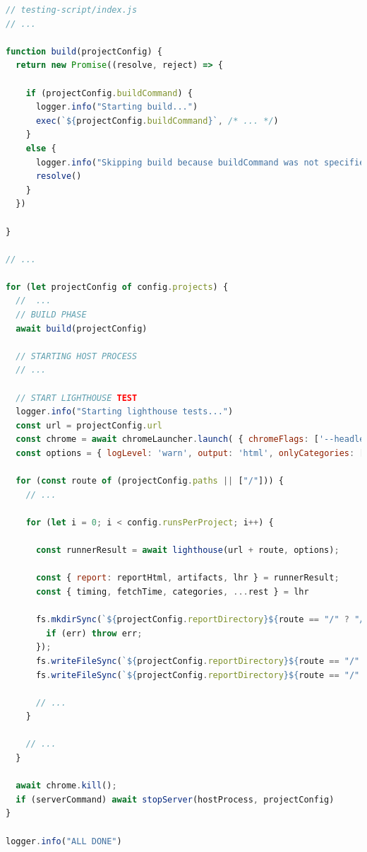 \documentclass[a4paper, 12pt]{article}
\begin{document}
\vspace{1cm}
\begin{lstlisting}[caption={Automation script for Lighthouse tests}, language=JavaScript, label={lst:lighthouse-script}]
// testing-script/index.js
// ...

function build(projectConfig) {
  return new Promise((resolve, reject) => {

    if (projectConfig.buildCommand) {
      logger.info("Starting build...")
      exec(`${projectConfig.buildCommand}`, /* ... */)
    }
    else {
      logger.info("Skipping build because buildCommand was not specified")
      resolve()
    }
  })

}

// ...

for (let projectConfig of config.projects) {
  //  ...
  // BUILD PHASE
  await build(projectConfig)

  // STARTING HOST PROCESS
  // ...

  // START LIGHTHOUSE TEST
  logger.info("Starting lighthouse tests...")
  const url = projectConfig.url
  const chrome = await chromeLauncher.launch( { chromeFlags: ['--headless'] } );
  const options = { logLevel: 'warn', output: 'html', onlyCategories: ['performance'], port: chrome.port, ignoreStatusCode: true };

  for (const route of (projectConfig.paths || ["/"])) {
    // ...

    for (let i = 0; i < config.runsPerProject; i++) {

      const runnerResult = await lighthouse(url + route, options);

      const { report: reportHtml, artifacts, lhr } = runnerResult;
      const { timing, fetchTime, categories, ...rest } = lhr

      fs.mkdirSync(`${projectConfig.reportDirectory}${route == "/" ? "/index" : route}`, { recursive: true }, (err) => {
        if (err) throw err;
      });
      fs.writeFileSync(`${projectConfig.reportDirectory}${route == "/" ? "/index" : route}/lighthouse-report-${new URL(url).hostname}-${dateToUriSafeString(new Date())}.html`, reportHtml);
      fs.writeFileSync(`${projectConfig.reportDirectory}${route == "/" ? "/index" : route}/lighthouse-report-${new URL(url).hostname}-${dateToUriSafeString(new Date())}.json`, JSON.stringify({ artifacts, lhr }, null, 2));

      // ...
    }

    // ...
  }

  await chrome.kill();
  if (serverCommand) await stopServer(hostProcess, projectConfig)
}

logger.info("ALL DONE")
\end{lstlisting}
\end{document}
